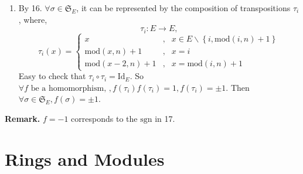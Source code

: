 \documentclass[12pt]{article}
\begin{document}
\begin{enumerate}
    \item By 16. $\forall \sigma \in \mathfrak{S}_E$, it can be represented by the composition of transpositions $\tau_i$, where,
        $$\tau_i: E\longrightarrow E,$$$$ \tau_i(x)=
        \left\{\begin{matrix}
        x&,&x\in E\backslash \left \{ i,\mathrm{mod} (i ,n)+1\right \} \\
        \mathrm{mod}(x,n)+1&,&x=i \\
        \mathrm{mod}( x-2,n)+1&,&x=\mathrm{mod}(i,n)+1
        \end{matrix}\right.$$
        Easy to check that $\tau_i\circ\tau_i=\mathrm{Id}_E$. So $\forall f \text{ be a homomorphism, },f(\tau_i)f(\tau_i)=1,f(\tau_i)=\pm 1$. Then $\forall \sigma \in \mathfrak{S}_E, f(\sigma)=\pm1$.
\end{enumerate}
\textbf{Remark.  }$f=-1$ corresponds to the $\mathrm{sgn}$ in 17.
\section{Rings and Modules}
\end{document}
